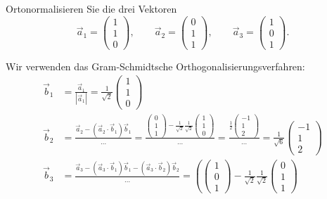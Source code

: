 Ortonormalisieren Sie die drei Vektoren
\[
\vec{a}_1=\begin{pmatrix}1\\1\\0\end{pmatrix},\qquad
\vec{a}_2=\begin{pmatrix}0\\1\\1\end{pmatrix},\qquad
\vec{a}_3=\begin{pmatrix}1\\0\\1\end{pmatrix}.
\]

\begin{loesung}
Wir verwenden das Gram-Schmidtsche Orthogonalisierungsverfahren:
\begin{align*}
\vec{b}_1
&=
\frac{\vec{a}_1}{|\vec{a}_1|}
=
\frac1{\sqrt{2}}\begin{pmatrix}1\\1\\0\end{pmatrix}
\\
\vec{b}_2
&=
\frac{\vec{a}_2 - (\vec{a}_2\cdot\vec{b}_1)\vec{b}_1}{\dots}
=
\frac{\displaystyle\begin{pmatrix}0\\1\\1\end{pmatrix}-\frac1{\sqrt{2}}\frac1{\sqrt{2}}\begin{pmatrix}1\\1\\0\end{pmatrix}}{\dots}
=
\frac{\displaystyle\frac12\begin{pmatrix}-1\\1\\2\end{pmatrix}}{\dots}
=
\frac{1}{\sqrt{6}}\begin{pmatrix}-1\\1\\2\end{pmatrix}
\\
\vec{b}_3
&=
\frac{\vec{a}_3-(\vec{a}_3\cdot\vec{b}_1)\vec{b}_1-(\vec{a}_3\cdot\vec{b}_2)\vec{b}_2}{\dots}
=
\left(
\begin{pmatrix}1\\0\\1\end{pmatrix}
-\frac1{\sqrt{2}}\frac1{\sqrt{2}}\begin{pmatrix}0\\1\\1\end{pmatrix}

\end{align*}
\end{loesung}
